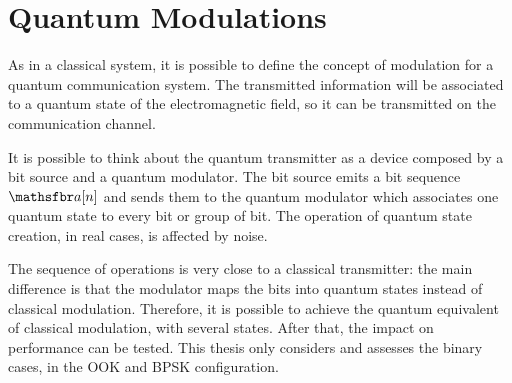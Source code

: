 \section{Quantum Modulations}
    As in a classical system, it is possible to define the concept of modulation for a 
    quantum communication system. The transmitted information will be associated to a 
    quantum state of the electromagnetic field, so it can be transmitted on the communication 
    channel.

    It is possible to think about the quantum transmitter as a device composed by a bit source 
    and a quantum modulator. The bit source
    emits a bit sequence $\msf{a}[n]$ and sends them to the quantum modulator which associates 
    one quantum state to every bit or group of bit. The operation of quantum state 
    creation, in real cases, is affected by noise.

    The sequence of operations is very close to a classical transmitter: the main difference is that
    the modulator maps the bits into quantum states instead of classical modulation. Therefore, it is 
    possible to achieve the quantum equivalent of classical modulation, with several states. After 
    that, the impact on performance can be tested.
    This thesis only considers and assesses the binary cases, in the OOK and BPSK 
    configuration.
    
